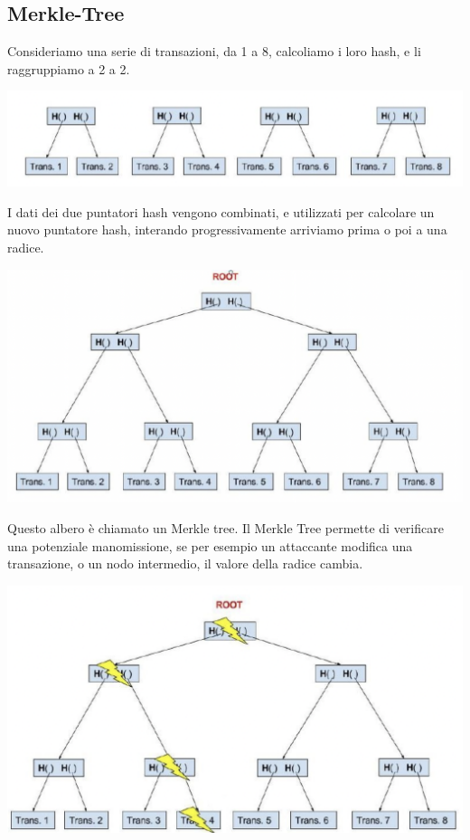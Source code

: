 \documentclass[11pt, oneside]{article}   	%
\begin{document}
\subsection*{Merkle-Tree}
Consideriamo una serie di transazioni, da 1 a 8, calcoliamo i loro hash, e li raggruppiamo a 2 a 2.
\begin{center}
\includegraphics[scale= 0.3]{2k}
\end{center}
I dati dei due puntatori hash vengono combinati, e utilizzati per calcolare un nuovo puntatore hash, interando progressivamente arriviamo prima o poi a una radice.
\begin{center}
\includegraphics[scale= 0.3]{3k}
\end{center}
Questo albero è chiamato un Merkle tree. Il Merkle Tree permette di verificare una potenziale manomissione, se per esempio un attaccante modifica una transazione, o un nodo intermedio, il valore della radice cambia.
\begin{center}
\includegraphics[scale= 0.3]{4k}
\end{center}
\end{document}
